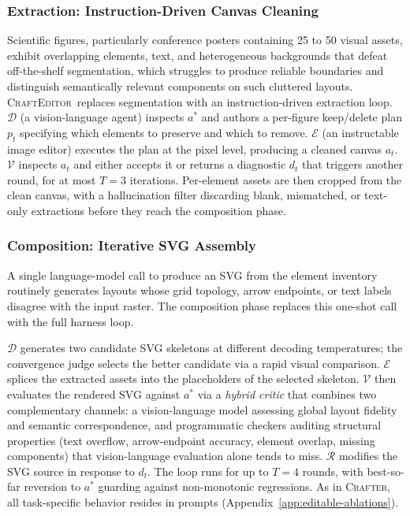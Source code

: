 \documentclass{llmxive}
\providecommand{\Crafter}{\textsc{Crafter}\xspace}
\providecommand{\Editor}{\textsc{CraftEditor}\xspace}
\begin{document}
\subsubsection{Extraction: Instruction-Driven Canvas Cleaning}
\label{sec:method-editor-extraction}

Scientific figures, particularly conference posters containing 25 to 50
visual assets, exhibit overlapping elements, text, and heterogeneous
backgrounds that defeat off-the-shelf segmentation, which struggles to
produce reliable boundaries and distinguish semantically relevant
components on such cluttered layouts. \Editor\ replaces segmentation with
an instruction-driven extraction loop. $\mathcal{D}$ (a vision-language
agent) inspects $a^*$ and authors a per-figure keep/delete plan $p_t$
specifying which elements to preserve and which to remove. $\mathcal{E}$
(an instructable image editor) executes the plan at the pixel level,
producing a cleaned canvas $a_t$. $\mathcal{V}$ inspects $a_t$ and
either accepts it or returns a diagnostic $d_t$ that triggers another
round, for at most $T{=}3$ iterations. Per-element assets are then
cropped from the clean canvas, with a hallucination filter discarding
blank, mismatched, or text-only extractions before they reach the
composition phase.

\subsubsection{Composition: Iterative SVG Assembly}
\label{sec:method-editor-composition}

A single language-model call to produce an SVG from the element inventory routinely generates layouts whose grid topology, arrow endpoints, or text labels disagree with the input raster. The composition phase replaces this one-shot call with the full harness loop.

$\mathcal{D}$ generates two candidate SVG skeletons at different decoding temperatures; the convergence judge selects the better candidate via a rapid visual comparison. $\mathcal{E}$ splices the extracted assets into the placeholders of the selected skeleton. $\mathcal{V}$ then evaluates the rendered SVG against $a^*$ via a \emph{hybrid critic} that combines two complementary channels: a vision-language model assessing global layout fidelity and semantic correspondence, and programmatic checkers auditing structural properties (text overflow, arrow-endpoint accuracy, element overlap, missing components) that vision-language evaluation alone tends to miss. $\mathcal{R}$ modifies the SVG source in response to $d_t$. The loop runs for up to $T{=}4$ rounds, with best-so-far reversion to $a^*$ guarding against non-monotonic regressions. As in \Crafter, all task-specific behavior resides in prompts (Appendix~\ref{app:editable-ablations}).
\end{document}

